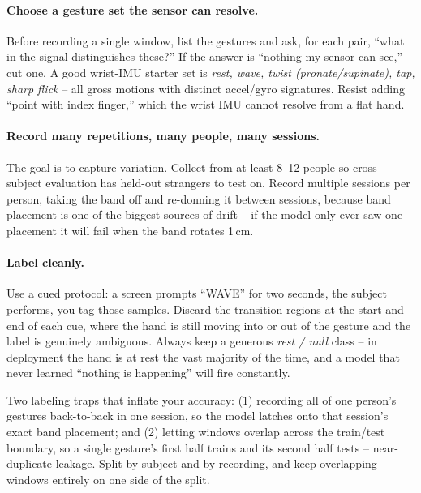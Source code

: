 \paragraph{Choose a gesture set the sensor can resolve.} Before recording a single window, list
the gestures and ask, for each pair, ``what in the signal distinguishes these?'' If the
answer is ``nothing my sensor can see,'' cut one. A good wrist-IMU starter set is
\emph{rest, wave, twist (pronate/supinate), tap, sharp flick} -- all gross motions with
distinct accel/gyro signatures. Resist adding ``point with index finger,'' which the wrist
IMU cannot resolve from a flat hand.

\paragraph{Record many repetitions, many people, many sessions.} The goal is to capture
variation. Collect from at least 8--12 people so cross-subject evaluation has held-out
strangers to test on. Record multiple sessions per person, taking the band off and
re-donning it between sessions, because band placement is one of the biggest sources of
drift -- if the model only ever saw one placement it will fail when the band rotates 1\,cm.

\paragraph{Label cleanly.} Use a cued protocol: a screen prompts ``WAVE'' for two
seconds, the subject performs, you tag those samples. Discard the transition regions at
the start and end of each cue, where the hand is still moving into or out of the gesture
and the label is genuinely ambiguous. Always keep a generous \emph{rest / null} class --
in deployment the hand is at rest the vast majority of the time, and a model that never
learned ``nothing is happening'' will fire constantly.

\begin{trapbox}
Two labeling traps that inflate your accuracy: (1) recording all of one person's
gestures back-to-back in one session, so the model latches onto that session's exact
band placement; and (2) letting windows overlap across the train/test boundary, so a
single gesture's first half trains and its second half tests -- near-duplicate leakage.
Split by subject and by recording, and keep overlapping windows entirely on one side of
the split.
\end{trapbox}

